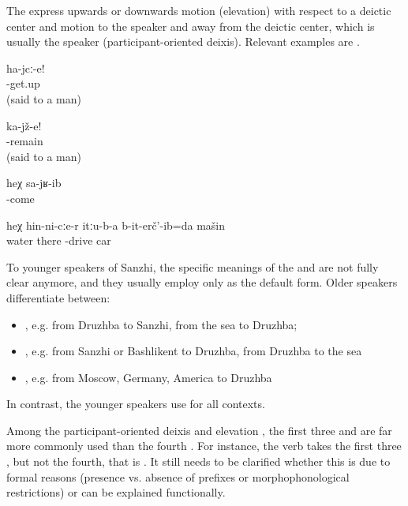 The  express upwards or downwards motion (elevation) with respect to a deictic center and motion to the speaker and away from the deictic center, which is usually the speaker (participant-oriented deixis). Relevant examples are .
%
\begin{exe}
	\ex	\label{ex:Get up (said to a man) verbs}
	\gll	ha-jcː-e!\\
		-get.up\\
	\glt	{}(said to a man)

	\ex	\label{ex:Sit down (said to a man) verbs}
	\gll	ka-jž-e!\\
		-remain\\
	\glt	{} (said to a man)

	\ex	\label{ex:He came back verbs}
	\gll	heχ	sa-jʁ-ib\\
			-come\\
	\glt	{}

	\ex	\label{ex:Down through that water I drove the car verbs}
	\gll	heχ	hin-ni-cːe-r	itːu-b-a	b-it-erč'-ib=da	mašin\\
			water	there	-drive	car\\
	\glt	{}
\end{exe}

To younger speakers of Sanzhi, the specific meanings of the   and  are not fully clear anymore, and they usually employ only  as the default form. Older speakers differentiate between:
%
\begin{itemize}
	\item	{} , e.g. from Druzhba to Sanzhi, from the sea to Druzhba;
	\item	{} , e.g. from Sanzhi or Bashlikent to Druzhba, from Druzhba to the sea
	\item	{} , e.g. from Moscow, Germany, America to Druzhba
\end{itemize}
%
In contrast, the younger speakers use  for all contexts.

Among the participant-oriented deixis and elevation , the first three   and  are far more commonly used than the fourth  . For instance, the verb  takes the first three , but not the fourth, that is . It still needs to be clarified whether this is due to formal reasons (presence vs. absence of  prefixes or morphophonological restrictions) or can be explained functionally. 

